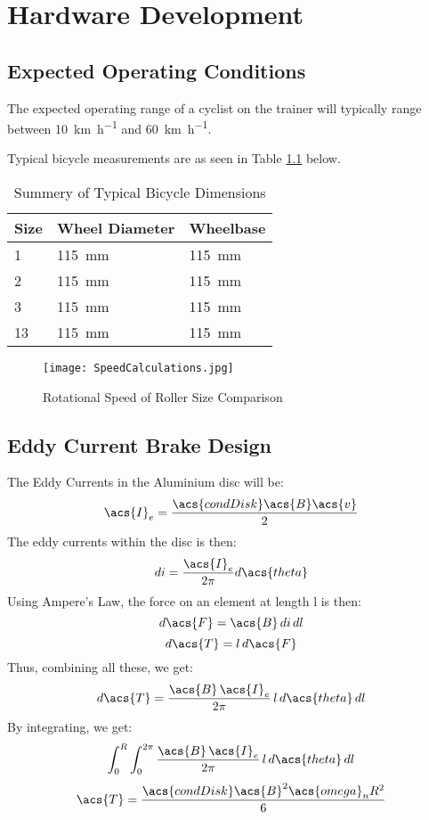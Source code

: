 
\chapter{Hardware Development}

\section{Expected Operating Conditions}
The expected operating range of a cyclist on the trainer will typically range between \SI{10}{\kilo\meter\per\hour} and \SI{60}{\kilo\meter\per\hour}.

Typical bicycle measurements are as seen in Table \ref{tab:bikesize} below.

\begin{table}[H]
	\renewcommand{\arraystretch}{1.2}
	\centering
	\caption{Summery of Typical Bicycle Dimensions}
	\begin{tabularx}{\textwidth}{p{1.4cm} >{\raggedright}p{5cm} >{\raggedright\arraybackslash}X}
		\toprule
		Size & Wheel Diameter & Wheelbase\\
		\midrule
		1 & \SI{115}{\milli\meter} & \SI{115}{\milli\meter}\\
		2 & \SI{115}{\milli\meter} & \SI{115}{\milli\meter}\\
		3 & \SI{115}{\milli\meter} & \SI{115}{\milli\meter}\\
		13 & \SI{115}{\milli\meter} & \SI{115}{\milli\meter}\\
		\bottomrule
	\end{tabularx}
	\label{tab:bikesize}
\end{table}

\begin{figure}[H]
	\begin{center}
		\texttt{[image: SpeedCalculations.jpg]}
		\caption{Rotational Speed of Roller Size Comparison}
		\label{fig:speedCalc}
	\end{center}
\end{figure}

\newpage
\section{Eddy Current Brake Design}

The Eddy Currents in the Aluminium disc will be:
\[
	\acs{I}_e = \frac{\acs{condDisk} \acs{B} \acs{v}}{2}
\]
The eddy currents within the disc is then:
\[
	di = \frac{\acs{I}_e}{2 \pi} d\acs{theta}
\]
Using Ampere's Law, the force on an element at length l is then:
\[
	d\acs{F} = \acs{B} \, di \, dl
\]
\[
	d\acs{T} = l \, d\acs{F}
\]
Thus, combining all these, we get:
\[
	d\acs{T} = \frac{\acs{B} \, \acs{I}_e}{2 \pi} \, l \, d\acs{theta} \, dl
\]
By integrating, we get:
\[
	\int_{0}^{R} \int_{0}^{2 \pi} \frac{\acs{B} \, \acs{I}_e}{2 \pi} \, l \, d\acs{theta} \, dl
\]
\[
	\acs{T} = \frac{\acs{condDisk}\acs{B}^2\acs{omega}_n R^2}{6}
\]

